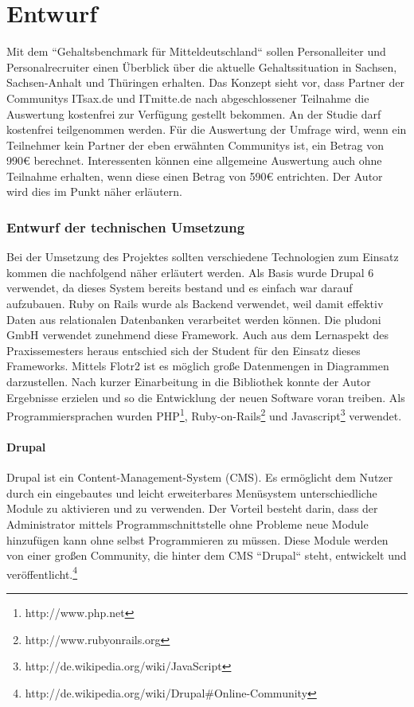 \part{Entwurf}
\label{sec:entwurf}
Mit dem ``Gehaltsbenchmark für Mitteldeutschland`` sollen Personalleiter und Personalrecruiter einen Überblick über die aktuelle Gehaltssituation in Sachsen, Sachsen-Anhalt und Thüringen erhalten. 
Das Konzept sieht vor, dass Partner der Communitys ITsax.de und ITmitte.de nach abgeschlossener Teilnahme die Auswertung kostenfrei zur Verfügung gestellt bekommen. An der Studie darf kostenfrei teilgenommen werden. Für die Auswertung der Umfrage wird, wenn ein Teilnehmer kein Partner der eben erwähnten Communitys ist, ein Betrag von 990€ berechnet. 
Interessenten können eine allgemeine Auswertung auch ohne Teilnahme erhalten, wenn diese einen Betrag von 590€ entrichten. Der Autor wird dies im Punkt  näher erläutern.
\section{Entwurf der technischen Umsetzung}
Bei der Umsetzung des Projektes sollten verschiedene Technologien zum Einsatz kommen die nachfolgend näher erläutert werden. Als Basis wurde Drupal 6 verwendet, da dieses System bereits bestand und es einfach war darauf aufzubauen. Ruby on Rails wurde als Backend verwendet, weil damit effektiv Daten aus relationalen Datenbanken verarbeitet werden können. Die pludoni GmbH verwendet zunehmend diese Framework. Auch aus dem Lernaspekt des Praxissemesters heraus entschied sich der Student für den Einsatz dieses Frameworks. Mittels Flotr2 ist es möglich große Datenmengen in Diagrammen darzustellen. Nach kurzer Einarbeitung in die Bibliothek konnte der Autor Ergebnisse erzielen und so die Entwicklung der neuen Software voran treiben. 
Als Programmiersprachen wurden PHP\footnote{http://www.php.net}, Ruby-on-Rails\footnote{http://www.rubyonrails.org} und Javascript\footnote{http://de.wikipedia.org/wiki/JavaScript} verwendet. 
\subsection{Drupal}
Drupal ist ein Content-Management-System (CMS). Es ermöglicht dem Nutzer durch ein eingebautes und leicht erweiterbares Menüsystem unterschiedliche Module zu aktivieren und zu verwenden. 
Der Vorteil besteht darin, dass der Administrator mittels Programmschnittstelle ohne Probleme neue Module hinzufügen kann ohne selbst Programmieren zu müssen. 
Diese Module werden von einer großen Community, die hinter dem CMS ``Drupal`` steht, entwickelt und veröffentlicht.\footnote{http://de.wikipedia.org/wiki/Drupal\#Online-Community}
